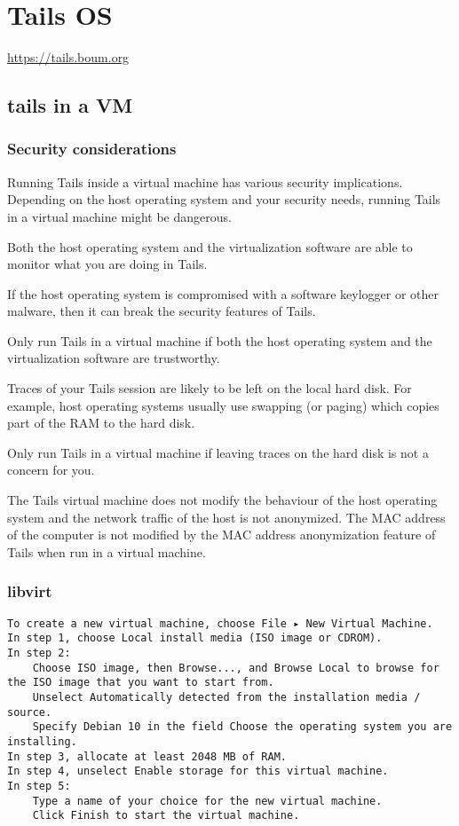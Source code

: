 \chapter{Tails OS}

\url{https://tails.boum.org}

\section{tails in a VM}
\subsection{Security considerations}

Running Tails inside a virtual machine has various security implications.
Depending on the host operating system and your security needs, running Tails
in a virtual machine might be dangerous.

    Both the host operating system and the virtualization software are able to
    monitor what you are doing in Tails.

    If the host operating system is compromised with a software keylogger or
    other malware, then it can break the security features of Tails.

    Only run Tails in a virtual machine if both the host operating system and
    the virtualization software are trustworthy.

    Traces of your Tails session are likely to be left on the local hard disk.
    For example, host operating systems usually use swapping (or paging) which
    copies part of the RAM to the hard disk.

    Only run Tails in a virtual machine if leaving traces on the hard disk is
    not a concern for you.

The Tails virtual machine does not modify the behaviour of the host operating
system and the network traffic of the host is not anonymized. The MAC address
of the computer is not modified by the MAC address anonymization feature of
Tails when run in a virtual machine. 
\subsection{libvirt}
\begin{verbatim}
To create a new virtual machine, choose File ▸ New Virtual Machine.
In step 1, choose Local install media (ISO image or CDROM).
In step 2:
    Choose ISO image, then Browse..., and Browse Local to browse for the ISO image that you want to start from.
    Unselect Automatically detected from the installation media / source.
    Specify Debian 10 in the field Choose the operating system you are installing.
In step 3, allocate at least 2048 MB of RAM.
In step 4, unselect Enable storage for this virtual machine.
In step 5:
    Type a name of your choice for the new virtual machine.
    Click Finish to start the virtual machine.
\end{verbatim}


